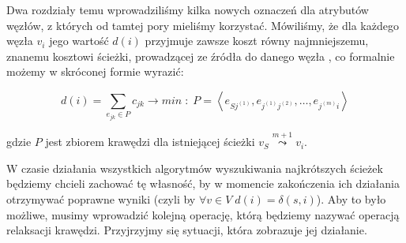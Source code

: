 Dwa rozdziały temu wprowadziliśmy kilka nowych oznaczeń dla atrybutów węzłów, z których od tamtej pory mieliśmy korzystać. Mówiliśmy, że dla każdego węzła $v_{i}$ jego wartość $d \left( i \right) $ przyjmuje zawsze koszt równy najmniejszemu, znanemu kosztowi ścieżki, prowadzącej ze źródła do danego węzła , co formalnie możemy w skróconej formie wyrazić:

\begin{equation}
d \left( i \right) = \sum_{e_{jk} \in P} c_{jk} \rightarrow min\; : \; P = \left \langle e_{Sj^{ \left( 1 \right) }}, e_{j^{ \left( 1 \right) } j^{ \left( 2 \right) }}, \ldots, e_{j^{ \left( m \right) } i } \right \rangle
\end{equation}

gdzie $P$ jest zbiorem krawędzi dla istniejącej ścieżki $v_{S} \overset{m+1}\leadsto v_{i}$.

W czasie działania wszystkich algorytmów wyszukiwania najkrótszych ścieżek będziemy chcieli zachować tę własność, by w momencie zakończenia ich działania otrzymywać poprawne wyniki (czyli by $\forall v \in V \; d \left( i \right) = \delta \left( s, i \right)$). Aby to było możliwe, musimy wprowadzić kolejną operację, którą będziemy nazywać operacją relaksacji krawędzi. Przyjrzyjmy się sytuacji, która zobrazuje jej działanie.


